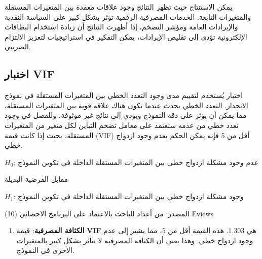 \documentclass[10pt,a4paper]{report}
\begin{document}
\begin{doublespacing}
يمكن الاستنتاج  حيث تظهر النتائج وجود علاقات معقدة بين المتغيرات المستقلة والمتغيرات التابعة. الخدمات المصرفية الرقمية تؤثر بشكل كبير على السياسة النقدية والإيرادات العامة ومؤشر التضخم، إذا أظهرت النتائج أن زيادة استخدام البطاقات الإلكترونية تؤدي إلى تقليص الإيرادات، يمكن التفكير في استراتيجيات لتعزيز الالتزام الضريبي.
\subsection{اختبار \textenglish{VIF}}
اختبار  يُستخدم لتقييم مدى وجود التعدد الخطي بين المتغيرات المستقلة في نموذج الانحدار. التعدد الخطي يحدث عندما تكون هناك علاقة قوية بين المتغيرات المستقلة، مما يمكن أن يؤثر على دقة النموذج ويؤدي إلى نتائج غير موثوقة، وللفصل في وجود تعدد خطي من عدمه سنعتمد على معامل تضخم التباين  لكل متغير من المتغيرات المستقلة، بحيث إذا كانت قيمة (VIF) أقل من 5 فإنه يمكن الحكم بعدم وجود ازدواج خطي.

$H_0$:  عدم وجود مشكلة ازدواج خطي بين المتغيرات المستقلة الداخلة في تكوين النموذج

مقابل الفرضية البديلة 

$H_1$: وجود مشكلة ازدواج خطي بين المتغيرات المستقلة الداخلة في تكوين النموذج
\begin{table}[H]
	\captionsetup{font=Large}  %
	\fontsize{12}{12}\selectfont
	\centering
	\caption{اختبار \textenglish{VIF}}
	\label{tab:15.3}
	\end{table}

المصدر: من أعداد الباحث بالاعتماد على البرنامج الاحصائي (10) Eviews

\begin{enumerate}
	\item \textbf{الكثافة المصرفية}: 
	قيمة \textbf{VIF} هي $1.303$. هذه القيمة أقل من $5$، مما يشير إلى عدم وجود ازدواج خطي. وهذا يعني أن الكثافة المصرفية لا تتأثر بشكل كبير بالمتغيرات الأخرى في النموذج.
	

\end{enumerate}
\end{doublespacing}
\end{document}
